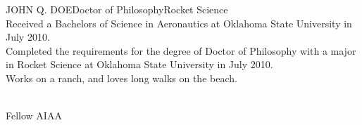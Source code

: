 \newpage
\begin{vita}{JOHN Q. DOE}{Doctor of Philosophy}{Rocket Science} %
     \\ Received a Bachelors of Science in Aeronautics at Oklahoma State University in July 2010. \\
Completed the requirements for the degree of Doctor of Philosophy with a major in Rocket Science at Oklahoma State University in July 2010.
     \\ Works on a ranch, and loves long walks on the beach.

     \\ Fellow AIAA
\end{vita}

